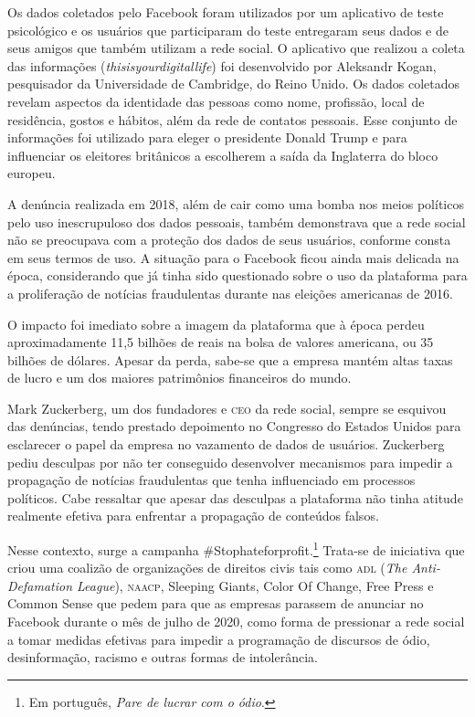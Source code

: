 Os dados coletados pelo Facebook foram utilizados por um aplicativo de
teste psicológico e os usuários que participaram do teste entregaram
seus dados e de seus amigos que também utilizam a rede social. O
aplicativo que realizou a coleta das
informações (\textit{thisisyourdigitallife}) foi desenvolvido por
Aleksandr Kogan, pesquisador da Universidade de Cambridge, do Reino
Unido. Os dados coletados revelam aspectos da identidade das pessoas
como nome, profissão, local de residência, gostos e hábitos, além da
rede de contatos pessoais. Esse conjunto de informações foi utilizado
para eleger o presidente Donald Trump e para influenciar os eleitores
britânicos a escolherem a saída da Inglaterra do bloco europeu.

A denúncia realizada em 2018, além de cair como uma bomba nos meios
políticos pelo uso inescrupuloso dos dados pessoais, também demonstrava
que a rede social não se preocupava com a proteção dos dados de seus
usuários, conforme consta em seus termos de uso. A situação para o
Facebook ficou ainda mais delicada na época, considerando que já tinha
sido questionado sobre o uso da plataforma para a proliferação de
notícias fraudulentas durante nas eleições americanas de 2016.

O impacto foi imediato sobre a imagem da plataforma que à época perdeu
aproximadamente 11,5 bilhões de reais na bolsa de valores americana, ou 
35 bilhões de dólares. Apesar da perda, sabe-se que a empresa mantém altas taxas de
lucro e um dos maiores patrimônios financeiros do mundo.

Mark Zuckerberg, um dos fundadores e \textsc{ceo} da rede social, sempre se
esquivou das denúncias, tendo prestado depoimento no Congresso do
Estados Unidos para esclarecer o papel da empresa no vazamento de dados
de usuários. Zuckerberg pediu desculpas por não ter conseguido
desenvolver mecanismos para impedir a propagação de notícias
fraudulentas que tenha influenciado em processos políticos. Cabe
ressaltar que apesar das desculpas a plataforma não tinha atitude
realmente efetiva para enfrentar a propagação de conteúdos falsos.

Nesse contexto, surge a campanha \#Stophateforprofit.\footnote{Em português, \textit{Pare de lucrar com o ódio}.} Trata-se de iniciativa que
criou uma coalizão de organizações de direitos civis tais como \textsc{adl} (\textit{The Anti-Defamation League}), \textsc{naacp}, Sleeping Giants, Color Of
Change, Free Press e Common Sense que pedem para que as empresas
parassem de anunciar no Facebook durante o mês de julho de 2020, como
forma de pressionar a rede social a tomar medidas efetivas para impedir
a programação de discursos de ódio, desinformação, racismo e outras
formas de intolerância.

